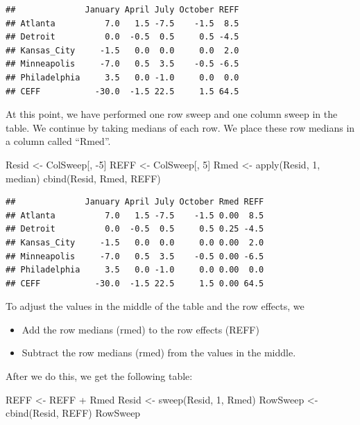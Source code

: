 \documentclass[
]{book}
\newenvironment{Shaded}{\begin{snugshade}}{\end{snugshade}}
\newcommand{\DecValTok}[1]{\textcolor[rgb]{0.00,0.00,0.81}{#1}}
\newcommand{\FunctionTok}[1]{\textcolor[rgb]{0.00,0.00,0.00}{#1}}
\newcommand{\NormalTok}[1]{#1}
\newcommand{\OtherTok}[1]{\textcolor[rgb]{0.56,0.35,0.01}{#1}}
\newcommand{\SpecialCharTok}[1]{\textcolor[rgb]{0.00,0.00,0.00}{#1}}
\providecommand{\tightlist}{%
  \setlength{\itemsep}{0pt}\setlength{\parskip}{0pt}}
\begin{document}
\begin{verbatim}
##              January April July October REFF
## Atlanta          7.0   1.5 -7.5    -1.5  8.5
## Detroit          0.0  -0.5  0.5     0.5 -4.5
## Kansas_City     -1.5   0.0  0.0     0.0  2.0
## Minneapolis     -7.0   0.5  3.5    -0.5 -6.5
## Philadelphia     3.5   0.0 -1.0     0.0  0.0
## CEFF           -30.0  -1.5 22.5     1.5 64.5
\end{verbatim}

At this point, we have performed one row sweep and one column sweep in the table. We continue by taking medians of each row. We place these row medians in a column called ``Rmed''.

\begin{Shaded}
\begin{Highlighting}[]
\NormalTok{Resid }\OtherTok{\textless{}{-}}\NormalTok{ ColSweep[, }\SpecialCharTok{{-}}\DecValTok{5}\NormalTok{]}
\NormalTok{REFF }\OtherTok{\textless{}{-}}\NormalTok{ ColSweep[, }\DecValTok{5}\NormalTok{]}
\NormalTok{Rmed }\OtherTok{\textless{}{-}} \FunctionTok{apply}\NormalTok{(Resid, }\DecValTok{1}\NormalTok{, median)}
\FunctionTok{cbind}\NormalTok{(Resid, Rmed, REFF)}
\end{Highlighting}
\end{Shaded}

\begin{verbatim}
##              January April July October Rmed REFF
## Atlanta          7.0   1.5 -7.5    -1.5 0.00  8.5
## Detroit          0.0  -0.5  0.5     0.5 0.25 -4.5
## Kansas_City     -1.5   0.0  0.0     0.0 0.00  2.0
## Minneapolis     -7.0   0.5  3.5    -0.5 0.00 -6.5
## Philadelphia     3.5   0.0 -1.0     0.0 0.00  0.0
## CEFF           -30.0  -1.5 22.5     1.5 0.00 64.5
\end{verbatim}

To adjust the values in the middle of the table and the row effects, we

\begin{itemize}
\tightlist
\item
  Add the row medians (rmed) to the row effects (REFF)
\item
  Subtract the row medians (rmed) from the values in the middle.
\end{itemize}

After we do this, we get the following table:

\begin{Shaded}
\begin{Highlighting}[]
\NormalTok{REFF }\OtherTok{\textless{}{-}}\NormalTok{ REFF }\SpecialCharTok{+}\NormalTok{ Rmed}
\NormalTok{Resid }\OtherTok{\textless{}{-}} \FunctionTok{sweep}\NormalTok{(Resid, }\DecValTok{1}\NormalTok{, Rmed)}
\NormalTok{RowSweep }\OtherTok{\textless{}{-}} \FunctionTok{cbind}\NormalTok{(Resid, REFF)}
\NormalTok{RowSweep}
\end{Highlighting}
\end{Shaded}
\end{document}
